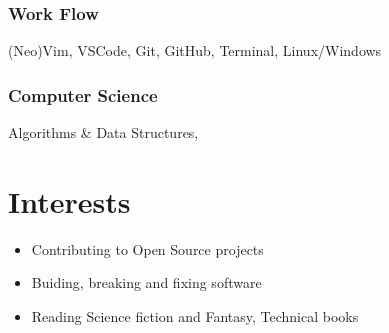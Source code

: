 \documentclass[11pt, oneside, a4paper, titlepage]{article}
\newcommand\skillsVSpace{\vspace{-0.3cm}}
\begin{document}
\begin{tcolorbox}
\begin{minipage}[t]{8cm}
\begin{tcolorbox}[grow to left by=0.6cm,colback=gray!25,colframe=white]
        \skillsVSpace
        \subsubsection{Work Flow}
        (Neo)Vim, VSCode, Git, GitHub, Terminal, Linux/Windows

        \skillsVSpace
        \subsubsection{Computer Science}
        Algorithms \& Data Structures, 

      \section*{Interests}
      \begin{itemize}
        \item{Contributing to Open Source projects}
        \item{Buiding, breaking and fixing software}
        \item{Reading Science fiction and Fantasy, Technical books}
      \end{itemize}
    \end{tcolorbox}
  \end{minipage}
  \begin{minipage}[t]{11cm}
    \vspace*{-0.5cm}
    \begin{tcolorbox}[grow to right by=0.75cm,colframe=white,colback=white]

\end{tcolorbox}
\end{minipage}
\end{tcolorbox}
\end{document}
